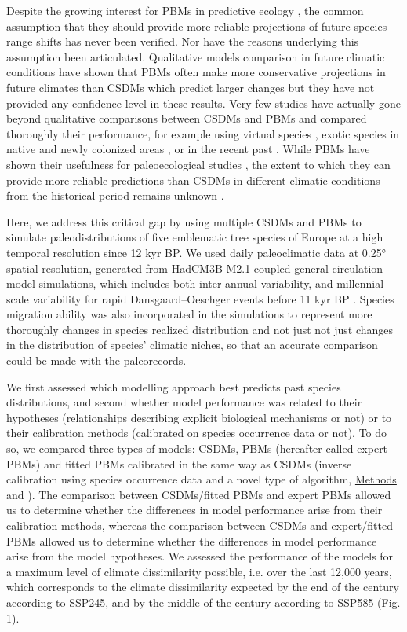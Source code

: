 \documentclass[pdflatex, sn-nature]{sn-jnl}%
\begin{document}
Despite the growing interest for PBMs in predictive ecology \cite{Connolly2017, Urban2016, Pilowsky2022}, the common assumption that they should provide more reliable projections of future species range shifts has never been verified. Nor have the reasons underlying this assumption been articulated. Qualitative models comparison in future climatic conditions have shown that PBMs often make more conservative projections in future climates than CSDMs which predict larger changes \cite{Morin2009, Cheaib2012, Gritti2013} but they have not provided any confidence level in these results. Very few studies have actually gone beyond qualitative comparisons between CSDMs and PBMs and compared thoroughly their performance, for example using virtual species \cite{Zurell2016}, exotic species in native and newly colonized areas \cite{Higgins2020}, or in the recent past \cite{Fordham2018}. 
While PBMs have shown their usefulness for paleoecological studies \cite{Saltre2013, Ruosch2016, Schwoerer2014}, the extent to which they can provide more reliable predictions than CSDMs in different climatic conditions from the historical period remains unknown \cite{UribeRivera2023, Briscoe2019}. 

Here, we address this critical gap by using multiple CSDMs and PBMs to simulate paleodistributions of five emblematic tree species of Europe at a high temporal resolution since 12 kyr BP. We used daily paleoclimatic data at 0.25° spatial resolution, generated from HadCM3B-M2.1 coupled general circulation model simulations, which includes both inter-annual variability, and millennial scale variability for rapid Dansgaard–Oeschger events before 11 kyr BP \cite{Armstrong2019}. Species migration ability was also incorporated in the simulations to represent more thoroughly changes in species realized distribution and not just not just changes in the distribution of species' climatic niches, so that an accurate comparison could be made with the paleorecords.

We first assessed which modelling approach best predicts past species distributions, and second whether model performance was related to their hypotheses (relationships describing explicit biological mechanisms or not) or to their calibration methods (calibrated on species occurrence data or not). To do so, we compared three types of models: CSDMs, PBMs (hereafter called expert PBMs) and fitted PBMs calibrated in the same way as CSDMs (inverse calibration using species occurrence data and a novel type of algorithm, \hyperref[methods]{Methods} and \citep{VanderMeersch2023}). The comparison between CSDMs/fitted PBMs and expert PBMs allowed us to determine whether the differences in model performance arise from their calibration methods, whereas the comparison between CSDMs and expert/fitted PBMs allowed us to determine whether the differences in model performance arise from the model hypotheses. We assessed the performance of the models for a maximum level of climate dissimilarity possible, i.e. over the last 12,000 years,  which corresponds to the climate dissimilarity expected by the end of the century according to SSP245, and by the middle of the century according to SSP585 ({Fig. 1}).
\end{document}
